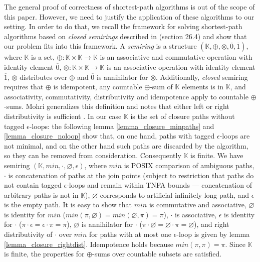 \documentclass[AMA,STIX1COL]{WileyNJD-v2}
\newcommand{\YK}{\mathbb{K}}
\newcommand*{\Xbar}[1]{\overline{#1}}
\begin{document}
The general proof of correctness of shortest-path algorithms is out of the scope of this paper.
However, we need to justify the application of these algorithms to our setting.
%
In order to do that, we recall the framework for solving shortest-path algorithms based on \emph{closed semirings}
described in \cite{CLR} (section 26.4)
and show that our problem fits into this framework.
%
A \emph{semiring} is a structure $(\YK, \oplus, \otimes, \Xbar{0}, \Xbar{1})$, where
$\YK$ is a set,
$\oplus \!\!:\!\! \YK \times \YK \rightarrow \YK$ is an associative and commutative operation with identity element $\Xbar{0}$,
$\otimes \!\!:\!\! \YK \times \YK \rightarrow \YK$ is an associative operation with identity element $\Xbar{1}$,
$\otimes$ distributes over $\oplus$
and $\Xbar{0}$ is annihilator for $\otimes$.
%
Additionally, \emph{closed} semiring requires that
$\oplus$ is idempotent,
any countable $\oplus$-sum of $\YK$ elements is in $\YK$,
and associativity, commutativity, distributivity and idempotence apply to countable $\oplus$-sums.
Mohri generalizes this definition and notes that either left or right distributivity is sufficient \cite{Moh02}.
%
In our case $\YK$ is the set of closure paths without tagged $\epsilon$-loops:
the following lemma \ref{lemma_closure_minpaths} and \ref{lemma_closure_noloop}
show that, on one hand, paths with tagged $\epsilon$-loops are not minimal,
and on the other hand such paths are discarded by the algorithm,
so they can be removed from consideration.
%
Consequently $\YK$ is finite.
We have semiring $(\YK, min, \cdot, \varnothing, \epsilon)$, where
$min$ is POSIX comparison of ambiguous paths,
$\cdot$ is concatenation of paths at the join points
(subject to restriction that paths do not contain tagged $\epsilon$-loops
and remain within TNFA bounds --- concatenation of arbitrary paths is not in $\YK$),
$\varnothing$ corresponds to artificial infinitely long path,
and $\epsilon$ is the empty path.
%
It is easy to show that
$min$ is commutative and associative,
$\varnothing$ is identity for $min$ ($min(\pi, \varnothing) = min(\varnothing, \pi) = \pi$),
$\cdot$ is associative,
$\epsilon$ is identity for $\cdot$ ($\pi \cdot \epsilon = \epsilon \cdot \pi = \pi$),
$\varnothing$ is annihilator for $\cdot$ ($\pi \cdot \varnothing = \varnothing \cdot \pi = \varnothing$),
and right distributivity of $\cdot$ over $min$ for paths with at most one $\epsilon$-loop is given by lemma \ref{lemma_closure_rightdist}.
%
Idempotence holds because $min(\pi, \pi) = \pi$.
%
Since $\YK$ is finite, the properties for $\oplus$-sums over countable subsets are satisfied.
\end{document}
